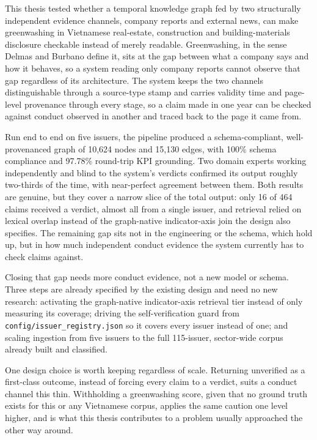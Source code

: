 \documentclass[fontsize=12pt,oneside,headings=small]{scrreprt}
\begin{document}
This thesis tested whether a temporal knowledge graph fed by two structurally independent evidence channels, company reports and external news, can make greenwashing in Vietnamese real-estate, construction and building-materials disclosure checkable instead of merely readable. Greenwashing, in the sense Delmas and Burbano define it, sits at the gap between what a company says and how it behaves, so a system reading only company reports cannot observe that gap regardless of its architecture. The system keeps the two channels distinguishable through a source-type stamp and carries validity time and page-level provenance through every stage, so a claim made in one year can be checked against conduct observed in another and traced back to the page it came from.

Run end to end on five issuers, the pipeline produced a schema-compliant, well-provenanced graph of 10,624 nodes and 15,130 edges, with 100\% schema compliance and 97.78\% round-trip KPI grounding. Two domain experts working independently and blind to the system's verdicts confirmed its output roughly two-thirds of the time, with near-perfect agreement between them. Both results are genuine, but they cover a narrow slice of the total output: only 16 of 464 claims received a verdict, almost all from a single issuer, and retrieval relied on lexical overlap instead of the graph-native indicator-axis join the design also specifies. The remaining gap sits not in the engineering or the schema, which hold up, but in how much independent conduct evidence the system currently has to check claims against.

Closing that gap needs more conduct evidence, not a new model or schema. Three steps are already specified by the existing design and need no new research: activating the graph-native indicator-axis retrieval tier instead of only measuring its coverage; driving the self-verification guard from \texttt{config/issuer\_registry.json} so it covers every issuer instead of one; and scaling ingestion from five issuers to the full 115-issuer, sector-wide corpus already built and classified.

One design choice is worth keeping regardless of scale. Returning \textsf{unverified} as a first-class outcome, instead of forcing every claim to a verdict, suits a conduct channel this thin. Withholding a greenwashing score, given that no ground truth exists for this or any Vietnamese corpus, applies the same caution one level higher, and is what this thesis contributes to a problem usually approached the other way around.
\end{document}
